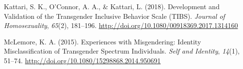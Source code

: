 \documentclass[12pt,twoside]{reedthesis}
\begin{document}

\noindent

\setlength{\parindent}{-0.20in}
\setlength{\leftskip}{0.20in}
\setlength{\parskip}{8pt}

\hypertarget{refs}{}
\leavevmode\hypertarget{ref-kattariDevelopmentValidationTransgender2018}{}%
Kattari, S. K., O'Connor, A. A., \& Kattari, L. (2018). Development and Validation of the Transgender Inclusive Behavior Scale (TIBS). \emph{Journal of Homosexuality}, \emph{65}(2), 181--196. \url{http://doi.org/10.1080/00918369.2017.1314160}

\leavevmode\hypertarget{ref-mclemoreExperiencesMisgenderingIdentity2015}{}%
McLemore, K. A. (2015). Experiences with Misgendering: Identity Misclassification of Transgender Spectrum Individuals. \emph{Self and Identity}, \emph{14}(1), 51--74. \url{http://doi.org/10.1080/15298868.2014.950691}


\end{document}
